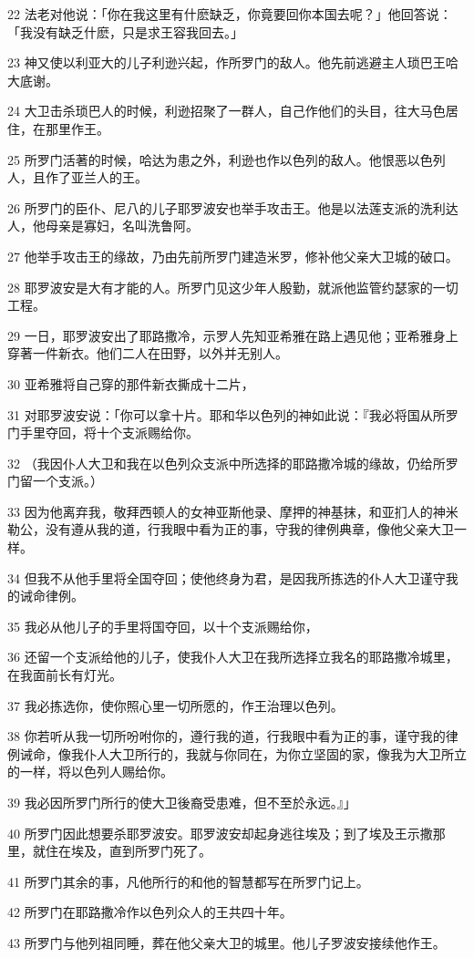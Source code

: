 \par 22 法老对他说：「你在我这里有什麽缺乏，你竟要回你本国去呢？」他回答说：「我没有缺乏什麽，只是求王容我回去。」
\par 23 神又使以利亚大的儿子利逊兴起，作所罗门的敌人。他先前逃避主人琐巴王哈大底谢。
\par 24 大卫击杀琐巴人的时候，利逊招聚了一群人，自己作他们的头目，往大马色居住，在那里作王。
\par 25 所罗门活著的时候，哈达为患之外，利逊也作以色列的敌人。他恨恶以色列人，且作了亚兰人的王。
\par 26 所罗门的臣仆、尼八的儿子耶罗波安也举手攻击王。他是以法莲支派的洗利达人，他母亲是寡妇，名叫洗鲁阿。
\par 27 他举手攻击王的缘故，乃由先前所罗门建造米罗，修补他父亲大卫城的破口。
\par 28 耶罗波安是大有才能的人。所罗门见这少年人殷勤，就派他监管约瑟家的一切工程。
\par 29 一日，耶罗波安出了耶路撒冷，示罗人先知亚希雅在路上遇见他；亚希雅身上穿著一件新衣。他们二人在田野，以外并无别人。
\par 30 亚希雅将自己穿的那件新衣撕成十二片，
\par 31 对耶罗波安说：「你可以拿十片。耶和华以色列的神如此说：『我必将国从所罗门手里夺回，将十个支派赐给你。
\par 32 （我因仆人大卫和我在以色列众支派中所选择的耶路撒冷城的缘故，仍给所罗门留一个支派。）
\par 33 因为他离弃我，敬拜西顿人的女神亚斯他录、摩押的神基抹，和亚扪人的神米勒公，没有遵从我的道，行我眼中看为正的事，守我的律例典章，像他父亲大卫一样。
\par 34 但我不从他手里将全国夺回；使他终身为君，是因我所拣选的仆人大卫谨守我的诫命律例。
\par 35 我必从他儿子的手里将国夺回，以十个支派赐给你，
\par 36 还留一个支派给他的儿子，使我仆人大卫在我所选择立我名的耶路撒冷城里，在我面前长有灯光。
\par 37 我必拣选你，使你照心里一切所愿的，作王治理以色列。
\par 38 你若听从我一切所吩咐你的，遵行我的道，行我眼中看为正的事，谨守我的律例诫命，像我仆人大卫所行的，我就与你同在，为你立坚固的家，像我为大卫所立的一样，将以色列人赐给你。
\par 39 我必因所罗门所行的使大卫後裔受患难，但不至於永远。』」
\par 40 所罗门因此想要杀耶罗波安。耶罗波安却起身逃往埃及；到了埃及王示撒那里，就住在埃及，直到所罗门死了。
\par 41 所罗门其余的事，凡他所行的和他的智慧都写在所罗门记上。
\par 42 所罗门在耶路撒冷作以色列众人的王共四十年。
\par 43 所罗门与他列祖同睡，葬在他父亲大卫的城里。他儿子罗波安接续他作王。

